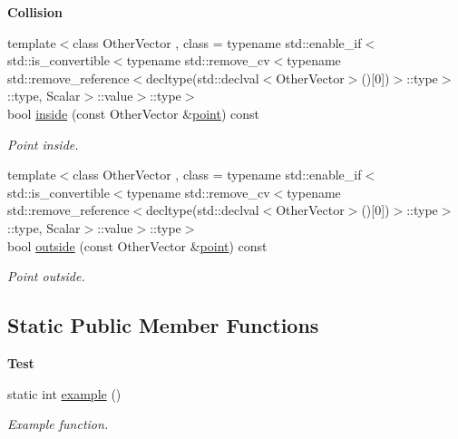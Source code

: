 \begin{Indent}{\bf Collision}\par
\begin{DoxyCompactItemize}
\item 
{\footnotesize template$<$class Other\-Vector , class  = typename std\-::enable\-\_\-if$<$std\-::is\-\_\-convertible$<$typename std\-::remove\-\_\-cv$<$typename std\-::remove\-\_\-reference$<$decltype(std\-::declval$<$\-Other\-Vector$>$()\mbox{[}0\mbox{]})$>$\-::type$>$\-::type, Scalar$>$\-::value$>$\-::type$>$ }\\bool \hyperlink{exceptionCone_afce298b94b2985098f43f714e0c25657}{inside} (const Other\-Vector \&\hyperlink{miscellaneous_8h_af4785a592bbb7b2a8882c18bb0101192}{point}) const 
\begin{DoxyCompactList}\small\item\em Point inside. \end{DoxyCompactList}\item 
{\footnotesize template$<$class Other\-Vector , class  = typename std\-::enable\-\_\-if$<$std\-::is\-\_\-convertible$<$typename std\-::remove\-\_\-cv$<$typename std\-::remove\-\_\-reference$<$decltype(std\-::declval$<$\-Other\-Vector$>$()\mbox{[}0\mbox{]})$>$\-::type$>$\-::type, Scalar$>$\-::value$>$\-::type$>$ }\\bool \hyperlink{exceptionCone_a54359eab94464b0adf2660a1b152ac96}{outside} (const Other\-Vector \&\hyperlink{miscellaneous_8h_af4785a592bbb7b2a8882c18bb0101192}{point}) const 
\begin{DoxyCompactList}\small\item\em Point outside. \end{DoxyCompactList}\end{DoxyCompactItemize}
\end{Indent}
\subsection*{Static Public Member Functions}
\begin{Indent}{\bf Test}\par
\begin{DoxyCompactItemize}
\item 
static int \hyperlink{exceptionCone_a388297ab0d58bf5788813ed91b300d6f}{example} ()
\begin{DoxyCompactList}\small\item\em Example function. \end{DoxyCompactList}\end{DoxyCompactItemize}
\end{Indent}
